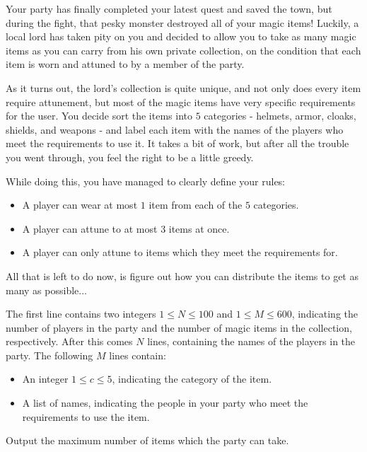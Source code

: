 
Your party has finally completed your latest quest and saved the town, but during the fight, that pesky monster destroyed all of your magic items!
Luckily, a local lord has taken pity on you and decided to allow you to take as many magic items as you can carry from his own private collection, on the condition that each item is worn and attuned to by a member of the party.

As it turns out, the lord's collection is quite unique, and not only does every item require attunement, but most of the magic items have very specific requirements for the user.
You decide sort the items into $5$ categories - helmets, armor, cloaks, shields, and weapons - and label each item with the names of the players who meet the requirements to use it.
It takes a bit of work, but after all the trouble you went through, you feel the right to be a little greedy.

While doing this, you have managed to clearly define your rules:

\begin{itemize}
\item A player can wear at most $1$ item from each of the $5$ categories.
\item A player can attune to at most $3$ items at once.
\item A player can only attune to items which they meet the requirements for.
\end{itemize}

All that is left to do now, is figure out how you can distribute the items to get as many as possible...

\begin{Input}

The first line contains two integers $1 \leq N \leq 100$ and $1 \leq M \leq 600$, indicating the number of players in the party and the number of magic items in the collection, respectively.
After this comes $N$ lines, containing the names of the players in the party.
The following $M$ lines contain:

\begin{itemize}
\item An integer $1 \leq c \leq 5$, indicating the category of the item.
\item A list of names, indicating the people in your party who meet the requirements to use the item.
\end{itemize}
\end{Input}

\begin{Output}
    
Output the maximum number of items which the party can take.
\end{Output}